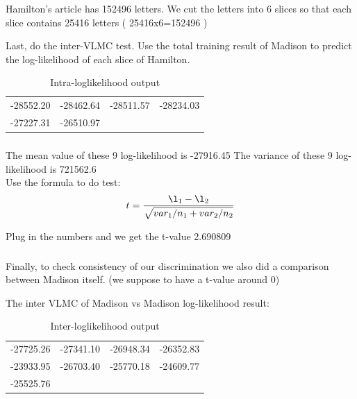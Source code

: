 \documentclass{beamer}
\begin{document}
\begin{frame}
\frametitle{}
Hamilton's article has 152496 letters. We cut the letters into 6 slices so
that each
slice contains 25416 letters ( 25416x6=152496 )\\
\par Last, do the inter-VLMC test. Use the total training result of Madison to
predict the log-likelihood of each slice of Hamilton.\\
\begin{table}[h!]
\caption{Intra-loglikelihood output} %
\centering
\begin{tabular}{c c c c} %
\hline %
 -28552.20 &-28462.64 &-28511.57 &-28234.03 \\
-27227.31 &-26510.97\\

\hline %
\end{tabular}
\end{table}


\end{frame}
\begin{frame}
\frametitle{}
 The mean value of these 9 log-likelihood is -27916.45
 The variance of these 9 log-likelihood is 721562.6\\

 Use the formula to do test:
$$t=\frac{\l_{1}-\l_{2}}{\sqrt{var_{1}/n_1+ var_{2}/n_2}}$$

Plug in the numbers and we get the t-value  2.690809\\


\end{frame}
\begin{frame}
\frametitle{}
\par Finally, to check consistency of our discrimination  we also did a comparison between
Madison itself. (we suppose to have a t-value around 0)\\
\par The inter VLMC of Madison vs Madison log-likelihood result:\\
\begin{table}[h!]
\caption{Inter-loglikelihood output} %
\centering
\begin{tabular}{c c c c} %
\hline %
 -27725.26 & -27341.10 & -26948.34 &-26352.83 \\
-23933.95& -26703.40& -25770.18& -24609.77\\
-25525.76\\

\hline %
\end{tabular}
\end{table}


\end{frame}
\end{document}

